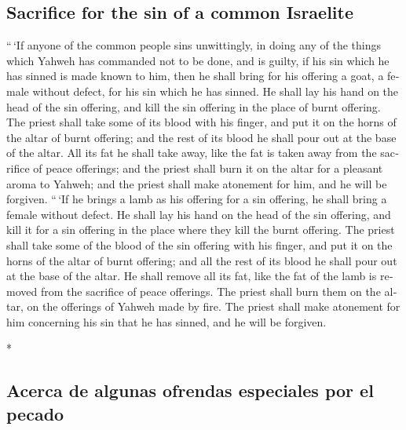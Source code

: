 \begin{paracol}{2}
\begin{otherlanguage}{english}
\hypertarget{sacrifice-for-the-sin-of-a-common-israelite}{%
\subsection{Sacrifice for the sin of a common
Israelite}\label{sacrifice-for-the-sin-of-a-common-israelite}}

 ``\,`If anyone of the common people sins unwittingly, in
doing any of the things which Yahweh has commanded not to be done, and
is guilty,  if his sin which he has sinned is made known
to him, then he shall bring for his offering a goat, a female without
defect, for his sin which he has sinned.  He shall lay
his hand on the head of the sin offering, and kill the sin offering in
the place of burnt offering.  The priest shall take some
of its blood with his finger, and put it on the horns of the altar of
burnt offering; and the rest of its blood he shall pour out at the base
of the altar.  All its fat he shall take away, like the
fat is taken away from the sacrifice of peace offerings; and the priest
shall burn it on the altar for a pleasant aroma to Yahweh; and the
priest shall make atonement for him, and he will be forgiven.
 ``\,`If he brings a lamb as his offering for a sin
offering, he shall bring a female without defect.  He
shall lay his hand on the head of the sin offering, and kill it for a
sin offering in the place where they kill the burnt offering.
 The priest shall take some of the blood of the sin
offering with his finger, and put it on the horns of the altar of burnt
offering; and all the rest of its blood he shall pour out at the base of
the altar.  He shall remove all its fat, like the fat of
the lamb is removed from the sacrifice of peace offerings. The priest
shall burn them on the altar, on the offerings of Yahweh made by fire.
The priest shall make atonement for him concerning his sin that he has
sinned, and he will be forgiven.

\end{otherlanguage}

\switchcolumn[0]*

\hypertarget{acerca-de-algunas-ofrendas-especiales-por-el-pecado}{%
\subsection{Acerca de algunas ofrendas especiales por el
pecado}\label{acerca-de-algunas-ofrendas-especiales-por-el-pecado}}


\end{paracol}
